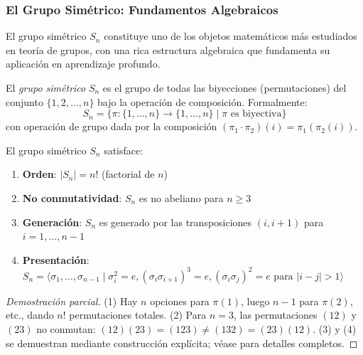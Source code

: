 \subsubsection{El Grupo Simétrico: Fundamentos Algebraicos}

El grupo simétrico $S_n$ constituye uno de los objetos matemáticos más estudiados en teoría de grupos, con una rica estructura algebraica que fundamenta su aplicación en aprendizaje profundo.

\begin{definition}\label{def:symmetric_group}
El \textit{grupo simétrico} $S_n$ es el grupo de todas las biyecciones (permutaciones) del conjunto $\{1, 2, \ldots, n\}$ bajo la operación de composición. Formalmente:
\begin{equation}
S_n = \{\pi: \{1,\ldots,n\} \to \{1,\ldots,n\} \mid \pi \text{ es biyectiva}\}
\end{equation}
con operación de grupo dada por la composición $(\pi_1 \cdot \pi_2)(i) = \pi_1(\pi_2(i))$.
\end{definition}

\begin{proposition}\label{prop:symmetric_group_properties}
El grupo simétrico $S_n$ satisface:
\begin{enumerate}
    \item \textbf{Orden}: $|S_n| = n!$ (factorial de $n$)
    \item \textbf{No conmutatividad}: $S_n$ es no abeliano para $n \geq 3$
    \item \textbf{Generación}: $S_n$ es generado por las transposiciones $(i, i+1)$ para $i=1,\ldots,n-1$
    \item \textbf{Presentación}: $S_n = \langle \sigma_1, \ldots, \sigma_{n-1} \mid \sigma_i^2 = e, (\sigma_i\sigma_{i+1})^3 = e, (\sigma_i\sigma_j)^2 = e \text{ para } |i-j| > 1 \rangle$
\end{enumerate}
\end{proposition}

\begin{proof}[Demostración parcial]
(1) Hay $n$ opciones para $\pi(1)$, luego $n-1$ para $\pi(2)$, etc., dando $n!$ permutaciones totales. (2) Para $n=3$, las permutaciones $(12)$ y $(23)$ no conmutan: $(12)(23) = (123) \neq (132) = (23)(12)$. (3) y (4) se demuestran mediante construcción explícita; véase \citep{dummit2004abstract} para detalles completos.
\end{proof}


